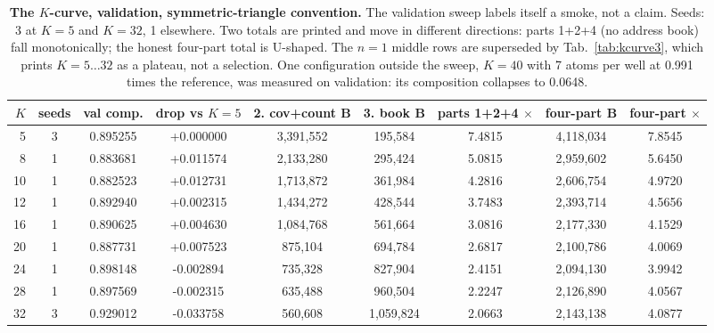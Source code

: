 \documentclass{article} %
\begin{document}
\begin{table}[h]
\centering\small
\caption{\textbf{The $K$-curve, validation, symmetric-triangle convention.} The validation sweep
labels itself a smoke, not a claim. Seeds: 3 at $K=5$ and $K=32$, 1 elsewhere. Two totals are %
printed and move in different directions: parts 1+2+4 (no address book) fall monotonically; the
honest four-part total is U-shaped. The $n=1$ middle rows are superseded by Tab.~\ref{tab:kcurve3},
which prints $K=5\ldots32$ as a plateau, not a selection. %
One configuration outside the sweep, $K=40$ with 7 atoms per well at 0.991 times the reference, was %
measured on validation: its composition collapses to 0.0648. %
}
\label{tab:kcurve}
\setlength{\tabcolsep}{2.4pt}
\begin{adjustbox}{max width=\linewidth}\begin{tabular}{rcccccccc}
\toprule
$K$ & seeds & val comp. & drop vs $K{=}5$ & 2. cov+count B & 3. book B & parts 1+2+4 $\times$ & four-part B & four-part $\times$ \\
\midrule
5 & 3 & 0.895255 & +0.000000 & 3,391,552 & 195,584 & 7.4815 & 4,118,034 & 7.8545 \\
8 & 1 & 0.883681 & +0.011574 & 2,133,280 & 295,424 & 5.0815 & 2,959,602 & 5.6450 \\
10 & 1 & 0.882523 & +0.012731 & 1,713,872 & 361,984 & 4.2816 & 2,606,754 & 4.9720 \\
12 & 1 & 0.892940 & +0.002315 & 1,434,272 & 428,544 & 3.7483 & 2,393,714 & 4.5656 \\
16 & 1 & 0.890625 & +0.004630 & 1,084,768 & 561,664 & 3.0816 & 2,177,330 & 4.1529 \\
20 & 1 & 0.887731 & +0.007523 & 875,104 & 694,784 & 2.6817 & 2,100,786 & 4.0069 \\
24 & 1 & 0.898148 & -0.002894 & 735,328 & 827,904 & 2.4151 & 2,094,130 & 3.9942 \\
28 & 1 & 0.897569 & -0.002315 & 635,488 & 960,504 & 2.2247 & 2,126,890 & 4.0567 \\
32 & 3 & 0.929012 & -0.033758 & 560,608 & 1,059,824 & 2.0663 & 2,143,138 & 4.0877 \\
\bottomrule
\end{tabular}\end{adjustbox}
\end{table}
\end{document}
